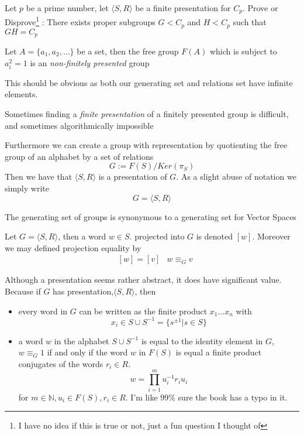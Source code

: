 \begin{exercise}
    Let $p$ be a prime number, let $\langle S,R\rangle$ be a finite presentation for $C_p$. Prove or Disprove\footnote{I have no idea if this is true or not, just a fun question I thought of} : There exists proper subgroups $G<C_p$ and $H<C_p$ such that $GH = C_p$
\end{exercise}
\begin{example}
    Let $A=\{a_1,a_2,\ldots\}$ be a set, then the free group $F(A)$ which is subject to $a_i^2=1$ is an \textit{non-finitely presented} group
\end{example}
This should be obvious as both our generating set and relations set have infinite elements.
\begin{remark}
    Sometimes finding a \textit{finite presentation} of a finitely presented group is difficult, and sometimes algorithmically impossible
\end{remark}
Furthermore we can create a group with representation by quotienting the free group of an alphabet by a set of relations
\[ G:=F(S)/Ker(\pi_S)\]
Then we have that $\langle S,R\rangle$ is a presentation of $G$. As a slight abuse of notation we simply write
\[ G=\langle S,R\rangle \]
\begin{remark}
    The generating set of groups is synonymous to a generating set for Vector Spaces
\end{remark}
\begin{definition}[Projection]
    Let $G=\langle S,R\rangle$, then a word $w\in S$. projected into $G$ is denoted $[w]$. Moreover we may defined projection equality by
    \begin{align*}
        &[w]=[v] &w\equiv_Gv
    \end{align*}
    
\end{definition}
Although a presentation seems rather abstract, it does have significant value. Because if $G$ has presentation,$\langle S,R\rangle$, then
\begin{itemize}
    \item every word in $G$ can be written as the finite product $x_1\ldots x_n$ with
    \[x_i\in S\cup S^{-1}=\{s^{\pm1}\vert s\in S\}\]
    \item a word $w$ in the alphabet $S\cup S^{-1}$ is equal to the identity element in $G$, $w\equiv_G 1$ if and only if the word $w$ in $F(S)$ is equal a finite product conjugates of the words $r_i\in R$.
    \[ w = \prod_{i=1}^{m}u_i^{-1}r_iu_i\]
    for $m\in\mathbb{N},u_i\in F(S),r_i\in R$. I'm like 99\% sure the book has a typo in it.
\end{itemize}
